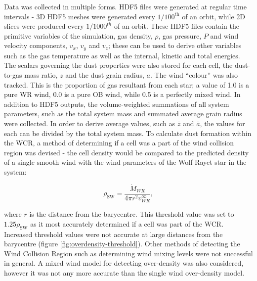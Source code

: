 Data was collected in multiple forms.
HDF5 files were generated at regular time intervals - 3D HDF5 meshes were generated every $1/100^{\text{th}}$ of an orbit, while 2D slices were produced every $1/1000^{th}$ of an orbit.
These HDF5 files contain the primitive variables of the simulation, gas density, $\rho$, gas pressure, $P$ and wind velocity components, $v_x$, $v_y$ and $v_z$; these can be used to derive other variables such as the gas temperature as well as the internal, kinetic and total energies.
The scalars governing the dust properties were also stored for each cell, the dust-to-gas mass ratio, $z$ and the dust grain radius, $a$.
The wind ``colour'' was also tracked.
This is the proportion of gas resultant from each star; a value of 1.0 is a pure WR wind, 0.0 is a pure OB wind, while 0.5 is a perfectly mixed wind.
In addition to HDF5 outputs, the volume-weighted summations of all system parameters, such as the total system mass and summated average grain radius were collected.
In order to derive average values, such as $\bar{z}$ and $\bar{a}$, the values for each can be divided by the total system mass.
To calculate dust formation within the WCR, a method of determining if a cell was a part of the wind collision region was devised - the cell density would be compared to the predicted density of a single smooth wind with the wind parameters of the Wolf-Rayet star in the system:

\begin{equation}
  \rho_\text{SW} = \frac{\dot{M}_{WR}}{4 \pi r^2 v^\infty_{WR}},
\end{equation}

\noindent
where $r$ is the distance from the barycentre. This threshold value was set to $1.25\rho_\text{SW}$ as it most accurately determined if a cell was part of the WCR.
Increased threshold values were not accurate at large distances from the barycentre (figure \ref{fig:overdensity-threshold}).
Other methods of detecting the Wind Collision Region such as determining wind mixing levels were not successful in general.
A mixed wind model for detecting over-density was also considered, however it was not any more accurate than the single wind over-density model. 

